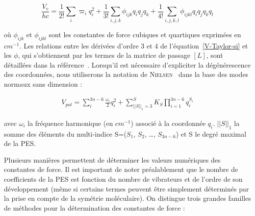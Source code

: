 \begin{equation}
	\frac{V_v}{hc} = \frac{1}{2!} \sum_i \varpi_i q^2_i + \frac{1}{3!} \sum_{i,j,k} \phi_{ijk}q_i q_j q_k + \frac{1}{4!} \sum_{i,j,k,l} \phi_{ijkl}q_i q_j q_k q_l
\end{equation}

\noindent où $\phi_{ijk}$ et $\phi_{ijkl}$ sont les constantes de force cubiques et quartiques exprimées en $cm^{-1}$. Les relations entre les dérivées d'ordre 3 et 4 de l'équation~\ref{V-Taylor-si} et les $\phi$, qui s'obtiennent par les termes de la matrice de passage $[L]$, sont détaillées dans la référence~\cite{hoy1972anharmonic}.
Lorsqu'il est nécessaire d'expliciter la dégénérescence des coordonnées, nous utiliserons la notation de \textsc{Nielsen}~\cite{nielsen1951vibration} dans la base des modes normaux sans dimension :

\begin{align} \label{V-Nielsen}
V_{pot} = \sum_i^{3n-6} \frac{\omega_i}{2} q_i^2 + \sum_{{\vert \vert S \vert \vert}_1 = 3}^{S} K_S \prod_{i=1}^{3n-6} q_i^{S_i}
\end{align}

avec $\omega_i$ la fréquence harmonique (en $cm^{-1}$) associé à la coordonnée $q_i$. ${\vert \vert S \vert \vert}_1$ la somme des éléments du multi-indice S=($S_1$, $S_2$, …, $S_{3n-6}$) et S le degré maximal de la PES. 

Plusieurs manières permettent de déterminer les valeurs numériques des constantes de force. Il est important de noter préalablement que le nombre de coefficients de la PES est fonction du nombre de vibrateurs et de l’ordre de son développement (même si certains termes peuvent être simplement déterminés par la prise en compte de la symétrie moléculaire). On distingue trois grandes familles de méthodes pour la détermination des constantes de force : \\

